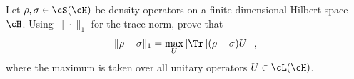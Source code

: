 Let $\rho,\sigma\in \cS(\cH)$ be density operators on a finite-dimensional Hilbert space $\cH$. Using $\|\cdot\|_1$ for the trace norm, prove that
$$
\|\rho-\sigma\|_1
=
\max_{U}
\left|
\Tr\left[(\rho-\sigma)U\right]
\right|,
$$
where the maximum is taken over all unitary operators $U\in \cL(\cH)$.
